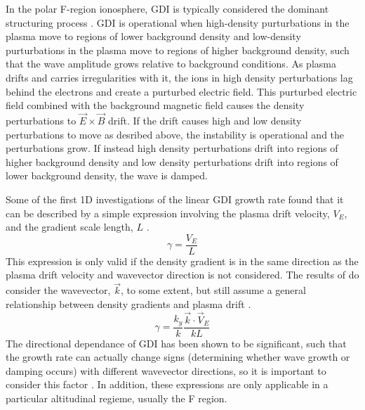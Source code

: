 In the polar F-region ionosphere, GDI is typically considered the dominant structuring process \citep{Weber1984,Cerisier1985,Basu1988,Tsunoda1988}.  GDI is operational when high-density purturbations in the plasma move to regions of lower background density and low-density purturbations in the plasma move to regions of higher background density, such that the wave amplitude grows relative to background conditions.  As plasma drifts and carries irregularities with it, the ions in high density perturbations lag behind the electrons and create a purturbed electric field.  This purturbed electric field combined with the background magnetic field causes the density perturbations to \(\vec{E}\times\vec{B}\) drift.  If the drift causes high and low density perturbations to move as desribed above, the instability is operational and the perturbations grow.  If instead high density perturbations drift into regions of higher background density and low density perturbations drift into regions of lower background density, the wave is damped.

Some of the first 1D investigations of the linear GDI growth rate found that it can be described by a simple expression involving the plasma drift velocity, \(V_E\), and the gradient scale length, \(L\) \citep{Simon1963,Hoh1963,Linson1970}.
\begin{equation}
	\label{eqn:gdi_old}
	\gamma = \frac{V_E}{L}
\end{equation}
This expression is only valid if the density gradient is in the same direction as the plasma drift velocity and wavevector direction is not considered.  The results of \citet{Keskinen1982,Keskinen1983} do consider the wavevector, \(\vec{k}\), to some extent, but still assume a general relationship between density gradients and plasma drift \citep{Tsunoda1988}.
\begin{equation}
	\label{eqn:gdi_80s}
	\gamma = \frac{k_y}{k}\frac{\vec{k}\cdot\vec{V}_E}{kL}
\end{equation}
The directional dependance of GDI has been shown to be significant, such that the growth rate can actually change signs (determining whether wave growth or damping occurs) with different wavevector directions, so it is important to consider this factor \citep{Makarevich2014c}.  In addition, these expressions are only applicable in a particular altitudinal regieme, usually the F region.

